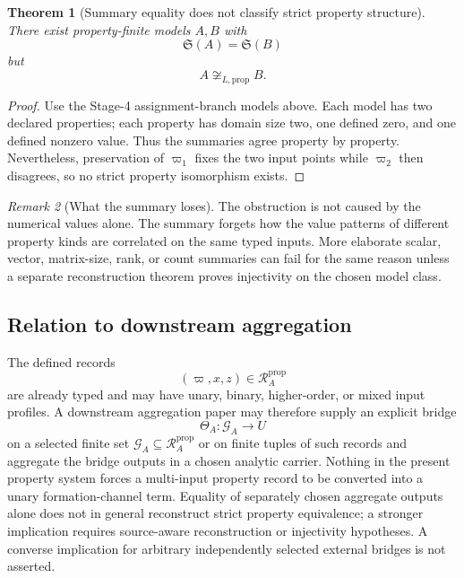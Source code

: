 \documentclass[11pt]{article}
\newcommand{\PropRec}{\mathcal R^{\mathrm{prop}}}
\newtheorem{theorem}{Theorem}[section]
\theoremstyle{definition}
\theoremstyle{remark}
\newtheorem{remark}[theorem]{Remark}
\begin{document}
\begin{theorem}[Summary equality does not classify strict property structure]
\label{thm:compression}
There exist property-finite models \(A,B\) with
\[
\mathfrak S(A)=\mathfrak S(B)
\]
but
\[
A\not\cong_{L,\mathrm{prop}}B.
\]
\end{theorem}

\begin{proof}
Use the Stage-4 assignment-branch models above.
Each model has two declared properties; each property has domain size two, one defined zero, and one defined nonzero value.
Thus the summaries agree property by property.
Nevertheless, preservation of \(\varpi_1\) fixes the two input points while \(\varpi_2\) then disagrees, so no strict property isomorphism exists.
\end{proof}

\begin{remark}[What the summary loses]
The obstruction is not caused by the numerical values alone.
The summary forgets how the value patterns of different property kinds are correlated on the same typed inputs.
More elaborate scalar, vector, matrix-size, rank, or count summaries can fail for the same reason unless a separate reconstruction theorem proves injectivity on the chosen model class.
\end{remark}

\subsection{Relation to downstream aggregation}

The defined records
\[
(\varpi,x,z)\in\PropRec_A
\]
are already typed and may have unary, binary, higher-order, or mixed input profiles.
A downstream aggregation paper may therefore supply an explicit bridge
\[
\Theta_A:\mathcal G_A\longrightarrow U
\]
on a selected finite set \(\mathcal G_A\subseteq\PropRec_A\) or on finite tuples of such records and aggregate the bridge outputs in a chosen analytic carrier.
Nothing in the present property system forces a multi-input property record to be converted into a unary formation-channel term.
Equality of separately chosen aggregate outputs alone does not in general reconstruct strict property equivalence; a stronger implication requires source-aware reconstruction or injectivity hypotheses. A converse implication for arbitrary independently selected external bridges is not asserted.
\end{document}

